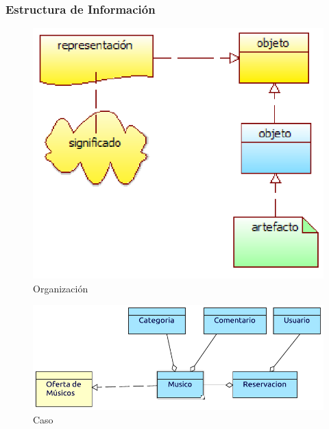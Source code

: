 \subsubsection{Estructura de Información}
\begin{figure}[h!]
	\centering
	\includegraphics[width=0.8\linewidth]{Desarrollo/ArquitecturaEmpresarial/Tecnologia/imgs/estructuraMetamodelo.PNG}
	\caption{Organización}
\end{figure}
\newpage
{}

\begin{figure}[h!]
	\centering
	\includegraphics[width=\linewidth]{Desarrollo/ArquitecturaEmpresarial/Tecnologia/imgs/estructura.pdf}
	\caption{Caso}
\end{figure}

\newpage

